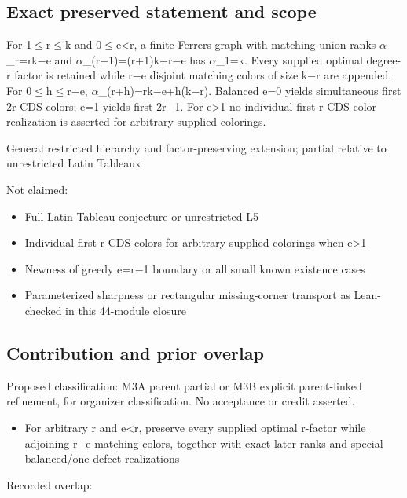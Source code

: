 \documentclass[11pt,a4paper]{article}
\begin{document}
\subsection{Exact preserved statement and scope}
For 1\ensuremath{\leq}r\ensuremath{\leq}k and 0\ensuremath{\leq}e<r, a finite Ferrers graph with matching-union ranks \ensuremath{\alpha}\_r=rk\ensuremath{-}e and \ensuremath{\alpha}\_(r+1)=(r+1)k\ensuremath{-}r\ensuremath{-}e has \ensuremath{\alpha}\_1=k. Every supplied optimal degree-r factor is retained while r\ensuremath{-}e disjoint matching colors of size k\ensuremath{-}r are appended. For 0\ensuremath{\leq}h\ensuremath{\leq}r\ensuremath{-}e, \ensuremath{\alpha}\_(r+h)=rk\ensuremath{-}e+h(k\ensuremath{-}r). Balanced e=0 yields simultaneous first 2r CDS colors; e=1 yields first 2r\ensuremath{-}1. For e>1 no individual first-r CDS-color realization is asserted for arbitrary supplied colorings.

General restricted hierarchy and factor-preserving extension; partial relative to unrestricted Latin Tableaux

Not claimed:

\begin{itemize}
\item Full Latin Tableau conjecture or unrestricted L5
\end{itemize}
\begin{itemize}
\item Individual first-r CDS colors for arbitrary supplied colorings when e>1
\end{itemize}
\begin{itemize}
\item Newness of greedy e=r\ensuremath{-}1 boundary or all small known existence cases
\end{itemize}
\begin{itemize}
\item Parameterized sharpness or rectangular missing-corner transport as Lean-checked in this 44-module closure
\end{itemize}
\subsection{Contribution and prior overlap}
Proposed classification: M3A parent partial or M3B explicit parent-linked refinement, for organizer classification. No acceptance or credit asserted.

\begin{itemize}
\item For arbitrary r and e<r, preserve every supplied optimal r-factor while adjoining r\ensuremath{-}e matching colors, together with exact later ranks and special balanced/one-defect realizations
\end{itemize}
Recorded overlap:
\end{document}
